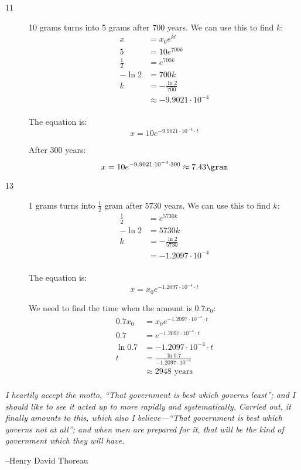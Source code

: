 \documentclass{exam}
\begin{document}
\begin{description}
\item[11]
10 grams turns into 5 grams after 700 years.  We can use this to find $k$:
\begin{align*}
  x           &= x_0 e^{kt} \\
  5           &= 10 e^{700 k} \\
  \frac{1}{2} &= e^{700 k} \\
  - \ln 2    &= 700 k \\
  k &= - \frac{\ln 2}{700} \\
    &\approx -9.9021 \cdot 10^{-4} \\
\end{align*}

The equation is:
\[
  x = 10 e^{-9.9021 \cdot 10^{-4} \cdot t}
\]

After 300 years:
\[
  x = 10 e^{-9.9021 \cdot 10^{-4} \cdot 300} \approx 7.43 \gram
\]

\item[13]
1 grams turns into $\frac{1}{2}$ gram after 5730 years.  We can use this to find $k$:
\begin{align*}
  \frac{1}{2} &= e^{5730k} \\
  - \ln 2    &= 5730 k \\
   k &= - \frac{\ln 2}{5730} \\
    &= -1.2097 \cdot 10^{-4} \\
\end{align*}

The equation is:
\[
  x = x_0 e^{-1.2097 \cdot 10^{-4} \cdot t}
\]

We need to find the time when the amount is $0.7 x_0$:
\begin{align*}
  0.7 x_0  &= x_0 e^{-1.2097 \cdot 10^{-4} \cdot t} \\
  0.7      &= e^{-1.2097 \cdot 10^{-4} \cdot t} \\
  \ln 0.7  &= -1.2097 \cdot 10^{-4} \cdot t \\
  t        &= \frac{\ln 0.7}{-1.2097 \cdot 10^{-4}} \\
           &\approx 2948 \text{ years} \\
\end{align*}


\end{description}
\else


\vspace{9 cm} 

{\em I heartily accept the motto, ``That government is best which governs least''; and I should like to see it acted up
  to more rapidly and systematically. Carried out, it finally amounts to this, which also I believe---``That government
  is best which governs not at all''; and when men are prepared for it, that will be the kind of government which they
  will have.}

\vspace{0.1 cm}
\hspace{0.5 cm} --Henry David Thoreau

\fi
\end{document}
